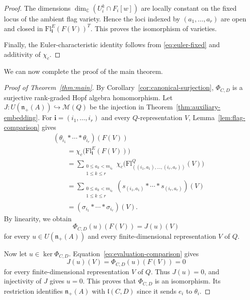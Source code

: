 \documentclass[12pt,reqno]{amsart}
\numberwithin{equation}{section}
\theoremstyle{definition}
\theoremstyle{remark}
\newcommand{\nplus}{\mathfrak n_+}
\theoremstyle{plain}
\theoremstyle{plain}
\begin{document}
\begin{proof}
The dimensions $\dim_{\mathbb C}(U_i^k\cap F_i[w])$
are locally constant on the fixed locus of the
ambient flag variety.
Hence the loci indexed by $(a_1,\ldots,a_r)$
are open and closed in
$\mathrm{Fl}_{\mathbf i}^{E}(F(V))^T$. This proves the isomorphism of varieties.

Finally, the Euler-characteristic identity follows from \eqref{eq:euler-fixed} and additivity of $\chi_c$.
\end{proof}

We can now complete the proof of the main theorem.

\begin{proof}[Proof of Theorem~\ref{thm:main}]
By Corollary~\ref{cor:canonical-surjection}, $\Phi_{C,D}$ is a surjective rank-graded Hopf algebra homomorphism. Let $J:U(\mathfrak n_+(A))\hookrightarrow \mathcal M(Q)$ be the injection in Theorem~\ref{thm:auxiliary-embedding}. For $\mathbf i=(i_1,\ldots,i_r)$ and every $Q$-representation $V$,  Lemma~\ref{lem:flag-comparison} gives
\[
\begin{aligned}
    &(\theta_{i_1}*\cdots*\theta_{i_r})(F(V))\\
    &\qquad=
    \chi_c\bigl(\mathrm{Fl}_{\mathbf i}^{E}(F(V))\bigr)\\
    &\qquad=
    \sum_{\substack{0\le a_k<m_{i_k}\\1\le k\le r}}
    \chi_c\bigl(
        \mathrm{Fl}^{Q}_{((i_1,a_1),\ldots,(i_r,a_r))}(V)
    \bigr)\\
    &\qquad=
    \sum_{\substack{0\le a_k<m_{i_k}\\1\le k\le r}}
    (s_{(i_1,a_1)}*\cdots*s_{(i_r,a_r)})(V)\\
    &\qquad=
    (\sigma_{i_1}*\cdots*\sigma_{i_r})(V).
\end{aligned}
\]
By linearity, we obtain
\begin{equation}\label{eq:evaluation-comparison}
    \Phi_{C,D}(u)(F(V))=J(u)(V)
\end{equation}
for every $u\in U(\mathfrak n_+(A))$ and every finite-dimensional representation $V$ of $Q$.

Now let $u\in\ker\Phi_{C,D}$. Equation~\eqref{eq:evaluation-comparison} gives
\[
    J(u)(V)=\Phi_{C,D}(u)(F(V))=0
\]
for every finite-dimensional representation $V$ of $Q$. Thus $J(u)=0$, and injectivity of $J$ gives $u=0$. This proves that $\Phi_{C,D}$ is an isomorphism. Its restriction identifies $\nplus(A)$ with $\mathfrak l(C,D)$ since it sends $e_i$ to $\theta_i$.
\end{proof}
\end{document}
